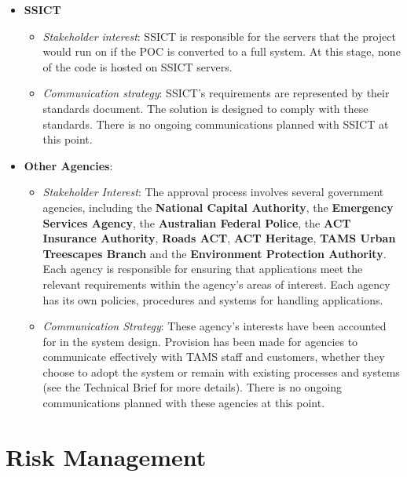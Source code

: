 \documentclass[12pt,a4paper,twosided]{article}
\begin{document}
\begin{itemize}
\itemsep1pt\parskip0pt
\item
  \textbf{SSICT}

  \begin{itemize}
  \itemsep1pt\parskip0pt
  \item
    \emph{Stakeholder interest}: SSICT is responsible for the servers
    that the project would run on if the POC is converted to a full
    system. At this stage, none of the code is hosted on SSICT servers.
  \item
    \emph{Communication strategy}: SSICT's requirements are represented
    by their standards document. The solution is designed to comply with
    these standards. There is no ongoing communications planned with
    SSICT at this point.
  \end{itemize}
\item
  \textbf{Other Agencies}:

  \begin{itemize}
  \itemsep1pt\parskip0pt
  \item
    \emph{Stakeholder Interest}: The approval process involves several
    government agencies, including the \textbf{National Capital
    Authority}, the \textbf{Emergency Services Agency}, the
    \textbf{Australian Federal Police}, the \textbf{ACT Insurance
    Authority}, \textbf{Roads ACT}, \textbf{ACT Heritage}, \textbf{TAMS
    Urban Treescapes Branch} and the \textbf{Environment Protection
    Authority}. Each agency is responsible for ensuring that
    applications meet the relevant requirements within the agency's
    areas of interest. Each agency has its own policies, procedures and
    systems for handling applications.
  \item
    \emph{Communication Strategy}: These agency's interests have been
    accounted for in the system design. Provision has been made for
    agencies to communicate effectively with TAMS staff and customers,
    whether they choose to adopt the system or remain with existing
    processes and systems (see the Technical Brief for more details).
    There is no ongoing communications planned with these agencies at
    this point.
  \end{itemize}
\end{itemize}

\section{Risk Management}
\end{document}
